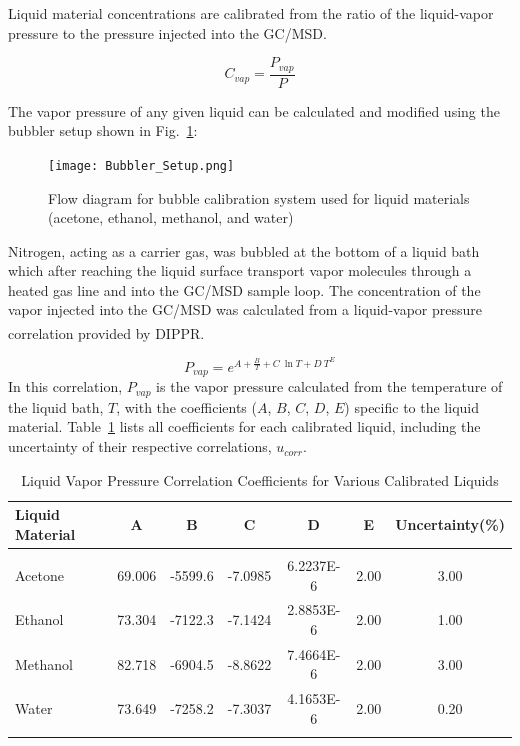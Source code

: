 \documentclass[12pt]{article}
\begin{document}
Liquid material concentrations are calibrated from the ratio of the liquid-vapor pressure to the pressure injected into the GC/MSD.

\begin{equation}
\label{eq:liquid_vapor_concentration}
C_{vap} =\frac {P_{vap}}{P}
\end{equation}

The vapor pressure of any given liquid can be calculated and modified using the bubbler setup shown in Fig.~\ref{fig:Bubbler}:

\begin{figure}[h!]
	\centering
\texttt{[image: Bubbler\_Setup.png]}
	\caption[Flow diagram for bubble calibration system used for liquid materials]{Flow diagram for bubble calibration system used for liquid materials (acetone, ethanol, methanol, and water)}
	\label{fig:Bubbler}
\end{figure}
Nitrogen, acting as a carrier gas, was bubbled at the bottom of a liquid bath which after reaching the liquid surface transport vapor molecules through a heated gas line and into the GC/MSD sample loop. The concentration of the vapor injected into the GC/MSD was calculated from a liquid-vapor pressure correlation provided by DIPPR\textsuperscript{\textregistered}.

\begin{equation}
\label{eq:liquid_vapor_pressure_correlation}
P_{vap} =e^{A+\frac{B}{T}+C~\ln{T}+D~T^{E}}
\end{equation}
In this correlation, $P_{vap}$ is the vapor pressure calculated from the temperature of the liquid bath, $T$, with the coefficients ($A$, $B$, $C$, $D$, $E$) specific to the liquid material. Table~\ref{tab:Liquid Calibrate_Table} lists all coefficients for each calibrated liquid, including the uncertainty of their respective correlations, $u_{corr}$.

\begin{table}[!]
\caption{Liquid Vapor Pressure Correlation Coefficients for Various Calibrated Liquids}
\label{tab:Liquid Calibrate_Table}
\centering
	\footnotesize
	\begin{tabular}{lcccccc}
			\hline
\textbf{Liquid Material} &\textbf{A}& \textbf{B}& \textbf{C}&\textbf{D}&\textbf{E}&\textbf{Uncertainty(\%)}\\
\hline
\\[0.001cm]
Acetone	&	69.006	&	-5599.6	&	-7.0985	&	6.2237E-6	& 	2.00	&  3.00\\
Ethanol	&	73.304	&	-7122.3	&	-7.1424	&	2.8853E-6	& 	2.00	&  1.00\\
Methanol	&	82.718	&	-6904.5	&	-8.8622	&	7.4664E-6	& 	2.00	&  3.00\\
Water		&	73.649	&	-7258.2	&	-7.3037	&	4.1653E-6	& 	2.00	&  0.20\\
\\[0.01cm]
\hline
\end{tabular}
\end{table}
\end{document}
